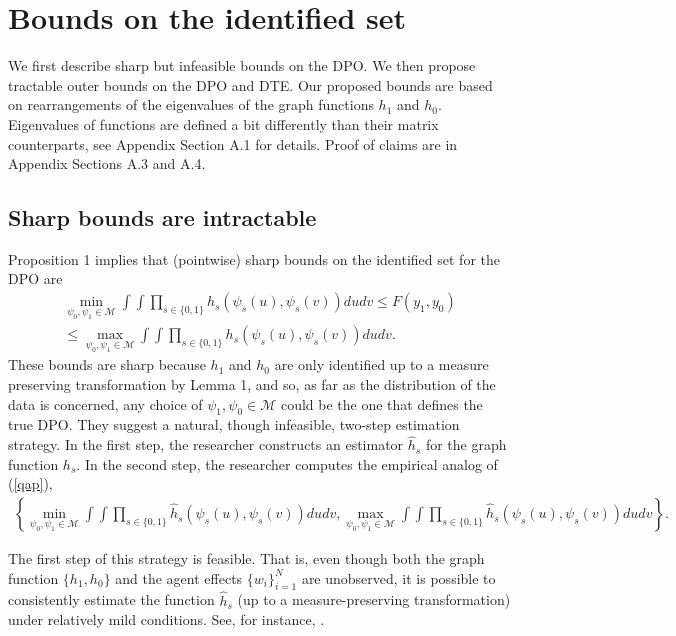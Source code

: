 \documentclass[12pt]{article}
\theoremstyle{definition}
\begin{document}
\section{Bounds on the identified set}
We first describe sharp but infeasible bounds on the DPO. We then propose tractable outer bounds on the DPO and DTE. Our proposed bounds are based on rearrangements of the eigenvalues of the graph functions $h_1$ and $h_0$. Eigenvalues of functions are defined a bit differently than their matrix counterparts, see Appendix Section A.1 for details. Proof of claims are in Appendix Sections A.3 and A.4. 


\subsection{Sharp bounds are intractable}
Proposition 1 implies that (pointwise) sharp bounds on the identified set for the DPO are 
\begin{align}\label{qap}
\min_{\psi_{0},\psi_{1} \in \mathcal{M}}\int\int \prod_{s \in \{0,1\}} h_{s}(\psi_s(u),\psi_s(v))dudv 
\leq F(y_{1},y_{0}) \nonumber \\ \leq  \max_{\psi_{0},\psi_{1} \in \mathcal{M}}\int\int \prod_{s \in \{0,1\}} h_{s}(\psi_s(u),\psi_s(v))dudv.
\end{align} 
These bounds are sharp because $h_1$ and $h_0$ are only identified up to a measure preserving transformation by Lemma 1, and so, as far as the distribution of the data is concerned, any choice of $\psi_1, \psi_0 \in \mathcal{M}$ could be the one that defines the true DPO. They suggest a natural, though infeasible, two-step estimation strategy. In the first step, the researcher constructs an estimator  $\hat{h}_{s}$ for the graph function $h_{s}$. In the second step, the researcher computes the empirical analog of (\ref{qap}), 
\begin{align}\label{naive estimator}
\left\{\min_{\psi_{0},\psi_{1} \in \mathcal{M}}\int\int \prod_{s \in \{0,1\}} \hat{h}_{s}(\psi_s(u),\psi_s(v))dudv ,  \max_{\psi_{0},\psi_{1} \in \mathcal{M}}\int\int \prod_{s \in \{0,1\}} \hat{h}_{s}(\psi_s(u),\psi_s(v))dudv\right\}.
\end{align}

The first step of this strategy is feasible. That is, even though both the graph function $\{h_1,h_0\}$ and the agent effects $\{w_i\}_{i=1}^{N}$ are unobserved, it is possible to consistently estimate the function $\hat{h}_s$ (up to a measure-preserving transformation) under relatively mild conditions. See, for instance, \cite{olhede2014network,chatterjee2015matrix,zhang2015estimating}. 
\end{document}
